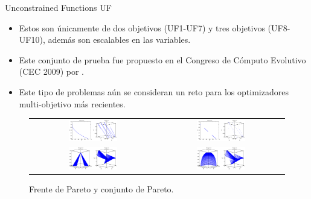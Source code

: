 \documentclass{beamer}
\begin{document}
\begin{frame}{Unconstrained Functions UF}
\begin{itemize}
\scriptsize
   \item Estos son únicamente de dos objetivos (UF1-UF7) y tres objetivos (UF8-UF10), además son escalables en las variables.
   \item Este conjunto de prueba fue propuesto en el Congreso de Cómputo Evolutivo (CEC 2009) por \citeauthor{Joel:CEC2009}.
   \item Este tipo de problemas aún se consideran un reto para los optimizadores multi-objetivo más recientes.
\end{itemize}
\begin{figure}[H]
\begin{tabular}{c c}
\includegraphics[width=0.4\textwidth]{UF1.eps}     &  \includegraphics[width=0.4\textwidth]{UF6.eps} \\
\includegraphics[width=0.4\textwidth]{UF9.eps}     &  \includegraphics[width=0.4\textwidth]{UF10.eps} \\
\end{tabular}
\centering
\caption{\scriptsize Frente de Pareto y conjunto de Pareto.}
\end{figure}

\end{frame}
\end{document}
